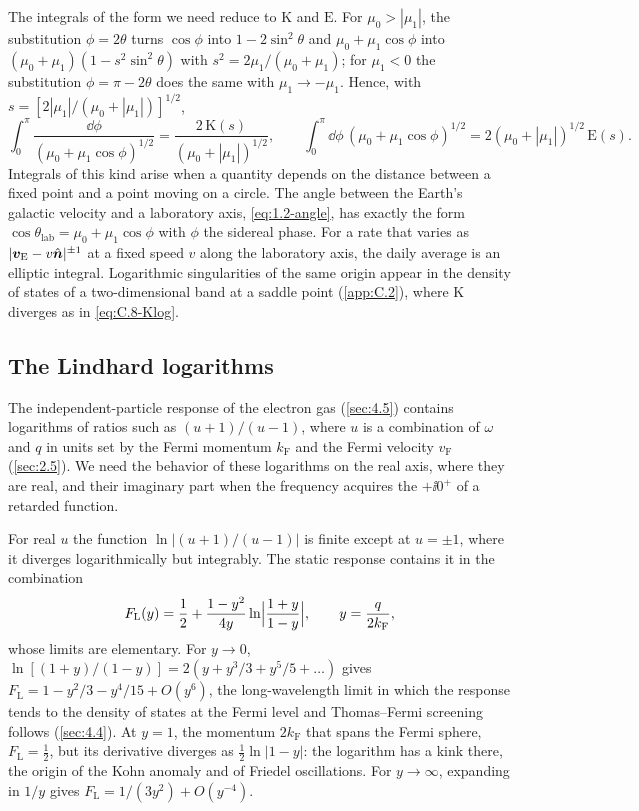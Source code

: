 The integrals of the form we need reduce to $\mathrm{K}$ and $\mathrm{E}$. For $\mu_0 > |\mu_1|$, the substitution $\phi = 2\theta$ turns $\cos\phi$ into $1 - 2\sin^2\theta$ and $\mu_0 + \mu_1\cos\phi$ into $(\mu_0 + \mu_1)(1 - s^2\sin^2\theta)$ with $s^2 = 2\mu_1/(\mu_0 + \mu_1)$; for $\mu_1 < 0$ the substitution $\phi = \pi - 2\theta$ does the same with $\mu_1 \to -\mu_1$. Hence, with $s = [2|\mu_1|/(\mu_0 + |\mu_1|)]^{1/2}$,
\begin{equation}
  \int_0^\pi\frac{\dd\phi}{(\mu_0 + \mu_1\cos\phi)^{1/2}} = \frac{2\,\mathrm{K}(s)}{(\mu_0 + |\mu_1|)^{1/2}}, \qquad
  \int_0^\pi\dd\phi\,(\mu_0 + \mu_1\cos\phi)^{1/2} = 2(\mu_0 + |\mu_1|)^{1/2}\,\mathrm{E}(s) .
  \label{eq:C.8-reduce}
\end{equation}
Integrals of this kind arise when a quantity depends on the distance between a fixed point and a point moving on a circle. The angle between the Earth's galactic velocity and a laboratory axis, \cref{eq:1.2-angle}, has exactly the form $\cos\theta_{\mathrm{lab}} = \mu_0 + \mu_1\cos\phi$ with $\phi$ the sidereal phase. For a rate that varies as $|\bm{v}_{\mathrm{E}} - v\hat{\bm{n}}|^{\pm1}$ at a fixed speed $v$ along the laboratory axis, the daily average is an elliptic integral. Logarithmic singularities of the same origin appear in the density of states of a two-dimensional band at a saddle point (\cref{app:C.2}), where $\mathrm{K}$ diverges as in \cref{eq:C.8-Klog}.

\subsection{The Lindhard logarithms}

The independent-particle response of the electron gas (\cref{sec:4.5}) contains logarithms of ratios such as $(u + 1)/(u - 1)$, where $u$ is a combination of $\omega$ and $q$ in units set by the Fermi momentum $k_{\mathrm{F}}$ and the Fermi velocity $v_{\mathrm{F}}$ (\cref{sec:2.5}). We need the behavior of these logarithms on the real axis, where they are real, and their imaginary part when the frequency acquires the $+\ii0^+$ of a retarded function.

For real $u$ the function $\ln|(u + 1)/(u - 1)|$ is finite except at $u = \pm1$, where it diverges logarithmically but integrably. The static response contains it in the combination
\begin{equation}
  F_{\mathrm{L}}(y) = \frac12 + \frac{1 - y^2}{4y}\ln\Bigl|\frac{1 + y}{1 - y}\Bigr|, \qquad y = \frac{q}{2k_{\mathrm{F}}} ,
  \label{eq:C.8-FL}
\end{equation}
whose limits are elementary. For $y \to 0$, $\ln[(1 + y)/(1 - y)] = 2(y + y^3/3 + y^5/5 + \dots)$ gives $F_{\mathrm{L}} = 1 - y^2/3 - y^4/15 + O(y^6)$, the long-wavelength limit in which the response tends to the density of states at the Fermi level and Thomas--Fermi screening follows (\cref{sec:4.4}). At $y = 1$, the momentum $2k_{\mathrm{F}}$ that spans the Fermi sphere, $F_{\mathrm{L}} = \tfrac12$, but its derivative diverges as $\tfrac12\ln|1 - y|$: the logarithm has a kink there, the origin of the Kohn anomaly and of Friedel oscillations. For $y \to \infty$, expanding in $1/y$ gives $F_{\mathrm{L}} = 1/(3y^2) + O(y^{-4})$.

